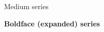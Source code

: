 \documentclass[a4paper,12pt]{article}
\begin{document}
	\textmd{Medium series}
	
	\textbf{Boldface (expanded) series}
	
\end{document}

